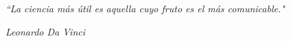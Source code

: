 \documentclass{beamer}
\begin{document}

\begin{frame}
\begin{center}
\Huge 
\textit{``La ciencia más útil es aquella cuyo fruto es el más comunicable."}
\end{center}
\begin{flushright}
\small
\textit{Leonardo Da Vinci}
\end{flushright}


\end{frame}
\end{document}
